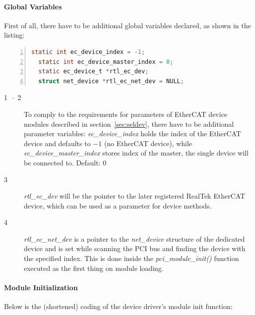 \documentclass[a4paper,12pt,BCOR6mm,bibtotoc,idxtotoc]{scrbook}
\newcommand{\linenum}[1]{\normalfont\textcircled{\tiny #1}}
\begin{document}
\paragraph{Global Variables}

First of all, there have to be additional global variables declared,
as shown in the listing:

\begin{lstlisting}[gobble=2,language=C,numbers=left]
  static int ec_device_index = -1;
  static int ec_device_master_index = 0;
  static ec_device_t *rtl_ec_dev;
  struct net_device *rtl_ec_net_dev = NULL;
\end{lstlisting}

\begin{description}
\item[\linenum{1} -- \linenum{2}] To
  comply to the requirements for parameters of EtherCAT device modules
  described in section~\ref{sec:seldev}, there have to be additional
  parameter variables: \textit{ec\_\-device\_\-index} holds the index
  of the EtherCAT device and defaults to $-1$ (no EtherCAT device),
  while \textit{ec\_device\_master\_index} stores index of the master,
  the single device will be connected to. Default: $0$
\item[\linenum{3}] \textit{rtl\_ec\_dev} will be
  the pointer to the later registered RealTek EtherCAT device, which
  can be used as a parameter for device methods.
\item[\linenum{4}] \textit{rtl\_ec\_net\_dev} is
  a pointer to the \textit{net\_device} structure of the dedicated
  device and is set while scanning the PCI bus and finding the device
  with the specified index. This is done inside the
  \textit{pci\_module\_init()} function executed as the first thing on
  module loading.
\end{description}

\paragraph{Module Initialization}

Below is the (shortened) coding of the device driver's module init
function:
\end{document}
